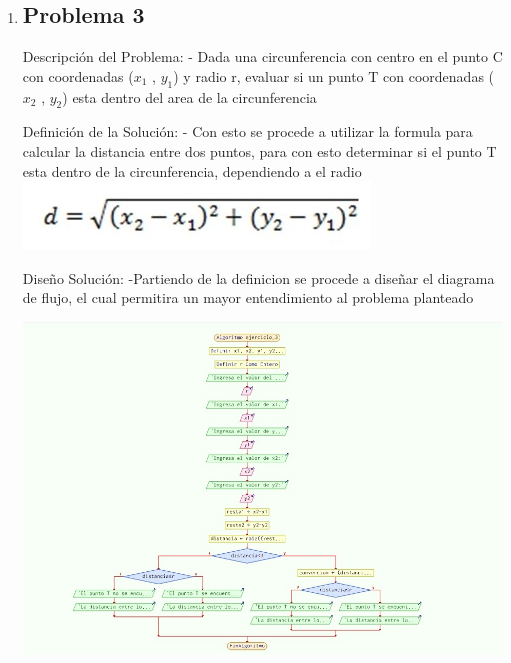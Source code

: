 \documentclass{IEEEcsmag}
\begin{document}
\begin{enumerate}
    

\item \subsection{Problema 3}

    Descripción del Problema:
    - Dada una circunferencia con centro en el punto C con coordenadas ($x_{1}$ , $y_{1}$) y radio r, evaluar si un punto T con coordenadas ($x_{2}$ , $y_{2}$) esta dentro del area de la circunferencia 
    
    Definición de la Solución:
    - Con esto se procede a utilizar la formula para calcular la distancia entre dos puntos, para con esto determinar si el punto T esta dentro de la circunferencia, dependiendo a el radio \\

    \centering
    \includegraphics[width=0.5\linewidth]{./latex_imagenes/Img_ejer3_1.jpg}

    Diseño Solución:
    -Partiendo de la definicion se procede a diseñar el diagrama de flujo, el cual permitira un mayor entendimiento al problema planteado 

    \centering
    \includegraphics[width=0.5\linewidth]{./latex_imagenes/Img_ejer3_2.jpg}
    

\end{enumerate}
\end{document}
